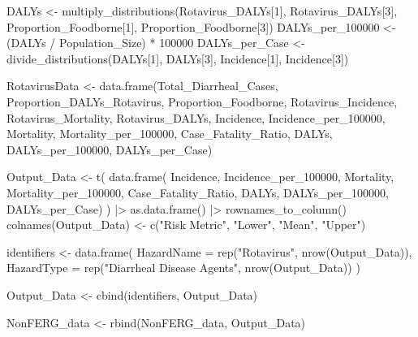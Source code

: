 \documentclass[
  letterpaper,
  DIV=11,
  numbers=noendperiod]{scrartcl}
\newenvironment{Shaded}{\begin{snugshade}}{\end{snugshade}}
\newcommand{\AttributeTok}[1]{\textcolor[rgb]{0.40,0.45,0.13}{#1}}
\newcommand{\DecValTok}[1]{\textcolor[rgb]{0.68,0.00,0.00}{#1}}
\newcommand{\FunctionTok}[1]{\textcolor[rgb]{0.28,0.35,0.67}{#1}}
\newcommand{\NormalTok}[1]{\textcolor[rgb]{0.00,0.23,0.31}{#1}}
\newcommand{\OtherTok}[1]{\textcolor[rgb]{0.00,0.23,0.31}{#1}}
\newcommand{\SpecialCharTok}[1]{\textcolor[rgb]{0.37,0.37,0.37}{#1}}
\newcommand{\StringTok}[1]{\textcolor[rgb]{0.13,0.47,0.30}{#1}}
\begin{document}
\begin{Shaded}
\begin{Highlighting}[]
\NormalTok{DALYs }\OtherTok{\textless{}{-}} \FunctionTok{multiply\_distributions}\NormalTok{(Rotavirus\_DALYs[}\DecValTok{1}\NormalTok{], Rotavirus\_DALYs[}\DecValTok{3}\NormalTok{],  Proportion\_Foodborne[}\DecValTok{1}\NormalTok{], Proportion\_Foodborne[}\DecValTok{3}\NormalTok{])}
\NormalTok{DALYs\_per\_100000 }\OtherTok{\textless{}{-}}\NormalTok{ (DALYs }\SpecialCharTok{/}\NormalTok{ Population\_Size) }\SpecialCharTok{*} \DecValTok{100000}
\NormalTok{DALYs\_per\_Case }\OtherTok{\textless{}{-}} \FunctionTok{divide\_distributions}\NormalTok{(DALYs[}\DecValTok{1}\NormalTok{], DALYs[}\DecValTok{3}\NormalTok{],  Incidence[}\DecValTok{1}\NormalTok{], Incidence[}\DecValTok{3}\NormalTok{])}

\NormalTok{RotavirusData }\OtherTok{\textless{}{-}} \FunctionTok{data.frame}\NormalTok{(Total\_Diarrheal\_Cases,  Proportion\_DALYs\_Rotavirus,  Proportion\_Foodborne,  Rotavirus\_Incidence,  Rotavirus\_Mortality,  Rotavirus\_DALYs,  Incidence,  Incidence\_per\_100000,  Mortality,  Mortality\_per\_100000,  Case\_Fatality\_Ratio,  DALYs,  DALYs\_per\_100000,  DALYs\_per\_Case)}

\NormalTok{Output\_Data }\OtherTok{\textless{}{-}} \FunctionTok{t}\NormalTok{(}
 \FunctionTok{data.frame}\NormalTok{(}
\NormalTok{ Incidence,  Incidence\_per\_100000, }
\NormalTok{ Mortality,  Mortality\_per\_100000, }
\NormalTok{ Case\_Fatality\_Ratio, }
\NormalTok{ DALYs,  DALYs\_per\_100000,  DALYs\_per\_Case)}
\NormalTok{ ) }\SpecialCharTok{|\textgreater{}} 
 \FunctionTok{as.data.frame}\NormalTok{() }\SpecialCharTok{|\textgreater{}} 
 \FunctionTok{rownames\_to\_column}\NormalTok{()}
\FunctionTok{colnames}\NormalTok{(Output\_Data) }\OtherTok{\textless{}{-}} \FunctionTok{c}\NormalTok{(}\StringTok{"Risk Metric"}\NormalTok{,  }\StringTok{"Lower"}\NormalTok{,  }\StringTok{"Mean"}\NormalTok{,  }\StringTok{"Upper"}\NormalTok{)}

\NormalTok{identifiers }\OtherTok{\textless{}{-}} \FunctionTok{data.frame}\NormalTok{(}
 \AttributeTok{HazardName =} \FunctionTok{rep}\NormalTok{(}\StringTok{"Rotavirus"}\NormalTok{,  }\FunctionTok{nrow}\NormalTok{(Output\_Data)), }
 \AttributeTok{HazardType =} \FunctionTok{rep}\NormalTok{(}\StringTok{"Diarrheal Disease Agents"}\NormalTok{,  }\FunctionTok{nrow}\NormalTok{(Output\_Data))}
\NormalTok{ )}
         

\NormalTok{Output\_Data }\OtherTok{\textless{}{-}} \FunctionTok{cbind}\NormalTok{(identifiers,  Output\_Data)}

\NormalTok{NonFERG\_data }\OtherTok{\textless{}{-}} \FunctionTok{rbind}\NormalTok{(NonFERG\_data,  Output\_Data)}
\end{Highlighting}
\end{Shaded}
\end{document}
